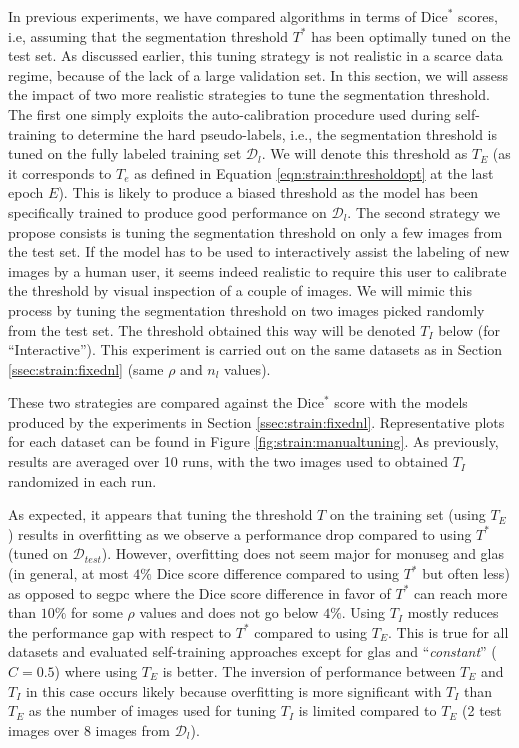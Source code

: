 In previous experiments, we have compared algorithms in terms of $\text{Dice}^*$ scores, i.e, assuming that the segmentation threshold $T^*$ has been optimally tuned on the test set. As discussed earlier, this tuning strategy is not realistic in a scarce data regime, because of the lack of a large validation set. In this section, we will assess the impact of two more realistic strategies to tune the segmentation threshold. The first one simply exploits the auto-calibration procedure used during self-training to determine the hard pseudo-labels, i.e., the segmentation threshold is tuned on the fully labeled training set $\mathcal{D}_l$. We will denote this threshold as $T_E$ (as it corresponds to $T_e$ as defined in Equation \ref{eqn:strain:thresholdopt} at the last epoch $E$). This is likely to produce a biased threshold as the model has been specifically trained to produce good performance on $\mathcal{D}_l$. The second strategy we propose consists is tuning the segmentation threshold on only a few images from the test set. If the model has to be used to interactively assist the labeling of new images by a human user, it seems indeed realistic to require this user to calibrate the threshold by visual inspection of a couple of images. We will mimic this process by tuning the segmentation threshold on two images picked randomly from the test set. The threshold obtained this way will be denoted $T_I$ below (for ``Interactive''). This experiment is carried out on the same datasets as in Section \ref{ssec:strain:fixednl} (same $\rho$ and $n_l$ values). 

These two strategies are compared against the Dice$^*$ score with the models produced by the experiments in Section \ref{ssec:strain:fixednl}. Representative plots for each dataset can be found in Figure \ref{fig:strain:manualtuning}. As previously, results are averaged over 10 runs, with the two images used to obtained $T_I$ randomized in each run.

As expected, it appears that tuning the threshold $T$ on the training set (\ie using $T_E$) results in overfitting as we observe a performance drop compared to using $T^*$ (tuned on $\mathcal{D}_{test}$). However, overfitting does not seem major for \acrshort{monuseg} and \acrshort{glas} (in general, at most $4\%$ Dice score difference compared to using $T^*$ but often less) as opposed to \acrshort{segpc} where the Dice score difference in favor of $T^*$ can reach more than $10\%$ for some $\rho$ values and does not go below $4\%$. Using $T_I$ mostly reduces the performance gap with respect to $T^*$ compared to using $T_E$. This is true for all datasets and evaluated self-training approaches except for \acrshort{glas} and ``\textit{constant}'' ($C=0.5$) where using $T_E$ is better. The inversion of performance between $T_E$ and $T_I$ in this case occurs likely because overfitting is more significant with $T_I$ than $T_E$ as the number of images used for tuning $T_I$ is limited compared to $T_E$ (2 test images over 8 images from $\mathcal{D}_l$).


